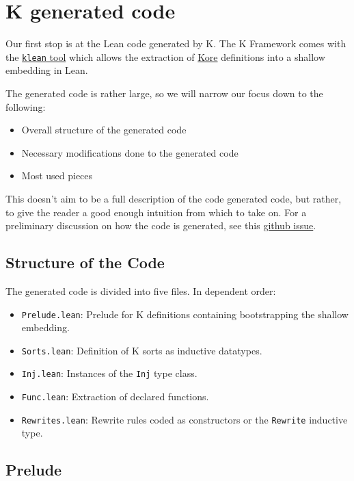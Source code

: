 \chapter{K generated code}\label{chap:gencode}

Our first stop is at the Lean code generated by K. The K Framework comes with
the
\href{https://github.com/runtimeverification/k/tree/master/pyk/src/pyk/klean}{\texttt{klean}
tool} which allows the extraction of
\href{https://kframework.org/docs/user_manual/#k-process-overview}{Kore}
definitions into a shallow embedding in Lean.

The generated code is rather
large, so we will narrow our focus down to the following:

\begin{itemize}
\item Overall structure of the generated code
\item Necessary modifications done to the generated code
\item Most used pieces
\end{itemize}

This doesn't aim to be a full description of the code generated code, but
rather, to give the reader a good enough intuition from which to take on. For a
preliminary discussion on how the code is generated, see this
\href{https://github.com/runtimeverification/k/issues/4552}{github issue}.

\section{Structure of the Code}

The generated code is divided into five files. In dependent order:

\begin{itemize}
\item \texttt{Prelude.lean}: Prelude for K definitions containing bootstrapping
  the shallow embedding.
\item \texttt{Sorts.lean}: Definition of K sorts as inductive datatypes.
\item \texttt{Inj.lean}: Instances of the \texttt{Inj} type class.
\item \texttt{Func.lean}: Extraction of declared functions.
\item \texttt{Rewrites.lean}: Rewrite rules coded as constructors or the
  \texttt{Rewrite} inductive type.
\end{itemize}

\section{Prelude}

